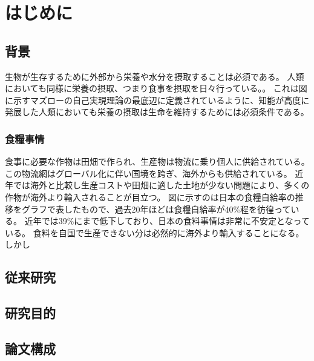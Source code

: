 \chapter{はじめに}
\section{背景}
生物が生存するために外部から栄養や水分を摂取することは必須である。
人類においても同様に栄養の摂取、つまり食事を摂取を日々行っている。。
これは図に示すマズローの自己実現理論の最底辺に定義されているように、知能が高度に発展した人類においても栄養の摂取は生命を維持するためには必須条件である。
\subsection{食糧事情}
食事に必要な作物は田畑で作られ、生産物は物流に乗り個人に供給されている。
この物流網はグローバル化に伴い国境を跨ぎ、海外からも供給されている。
近年では海外と比較し生産コストや田畑に適した土地が少ない問題により、多くの作物が海外より輸入されることが目立つ。
図に示すのは日本の食糧自給率の推移をグラフで表したもので、過去20年ほどは食糧自給率が40\%程を彷徨っている。
近年では39\%にまで低下しており、日本の食料事情は非常に不安定となっている。
食料を自国で生産できない分は必然的に海外より輸入することになる。
しかし

\section{従来研究}
\section{研究目的}
\section{論文構成}
